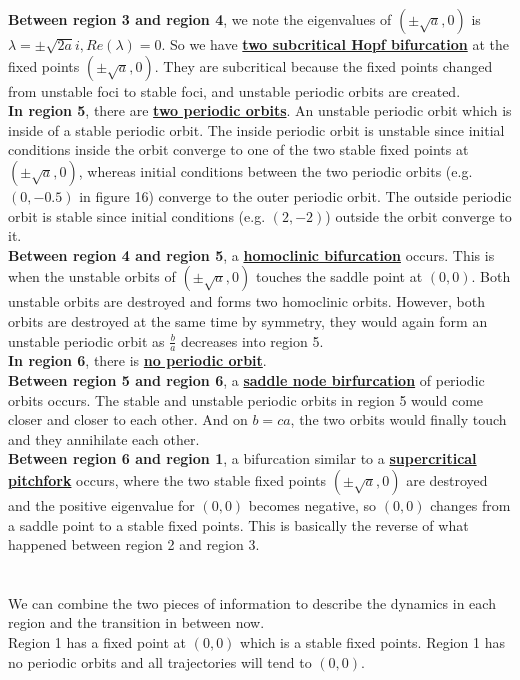 \documentclass[10pt]{article}
\begin{document}
\textbf{Between region 3 and region 4}, we note the eigenvalues of $(\pm\sqrt{a},0)$ is $\lambda=\pm\sqrt{2a}i, Re(\lambda)=0$. So we have \underline{\textbf{two subcritical Hopf bifurcation}} at the fixed points $(\pm\sqrt{a},0)$. They are subcritical because the fixed points changed from unstable foci to stable foci, and unstable periodic orbits are created.\\
\textbf{In region 5}, there are \underline{\textbf{two periodic orbits}}. An unstable periodic orbit which is inside of a stable periodic orbit. The inside periodic orbit is unstable since initial conditions inside the orbit converge to one of the two stable fixed points at $(\pm\sqrt{a},0)$, whereas initial conditions between the two periodic orbits (e.g. $(0,-0.5)$ in figure 16) converge to the outer periodic orbit. The outside periodic orbit is stable since initial conditions (e.g. $(2,-2)$) outside the orbit converge to it.\\
\textbf{Between region 4 and region 5}, a \underline{\textbf{homoclinic bifurcation}} occurs. This is when the unstable orbits of $(\pm\sqrt{a},0)$ touches the saddle point at $(0,0)$. Both unstable orbits are destroyed and forms two homoclinic orbits. However, both orbits are destroyed at the same time by symmetry, they would again form an unstable periodic orbit as $\frac{b}{a}$ decreases into region 5.\\
\textbf{In region 6}, there is \underline{\textbf{no periodic orbit}}.\\
\textbf{Between region 5 and region 6}, a \underline{\textbf{saddle node birfurcation}} of periodic orbits occurs. The stable and unstable periodic orbits in region 5 would come closer and closer to each other. And on $b=ca$, the two orbits would finally touch and they annihilate each other.\\
\textbf{Between region 6 and region 1}, a bifurcation similar to a \underline{\textbf{supercritical pitchfork}} occurs, where the two stable fixed points $(\pm\sqrt{a},0)$ are destroyed and the positive eigenvalue for $(0,0)$ becomes negative, so $(0,0)$ changes from a saddle point to a stable fixed points. This is basically the reverse of what happened between region 2 and region 3.\\\\\\
\noindent
We can combine the two pieces of information to describe the dynamics in each region and the transition in between now.\\
Region 1 has a fixed point at $(0,0)$ which is a stable fixed points. Region 1 has no periodic orbits and all trajectories will tend to $(0,0)$.\\
\end{document}

